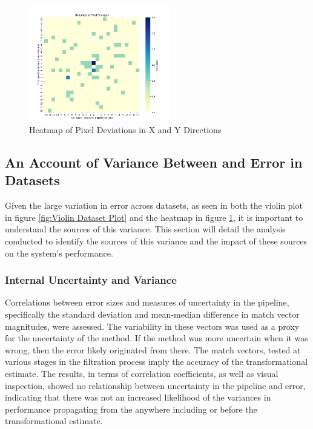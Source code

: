 \begin{figure}[H]
    \centering
    \includegraphics[width=0.55\textwidth]{Chapter 5/RESULTPLOTS/BIASPLOT_XY_HEAT.png}
    \caption{Heatmap of Pixel Deviations in X and Y Directions}
    \label{fig:Heatmap_XY_Dev}
\end{figure}


\subsection{An Account of Variance Between and Error in Datasets}
Given the large variation in error across datasets, as seen in both the violin plot in figure \ref{fig:Violin Dataset Plot} and the heatmap in figure \ref{fig:Heatmap_XY_Dev}, it is important to understand the sources of this variance. This section will detail the analysis conducted to identify the sources of this variance and the impact of these sources on the system's performance.

\subsubsection{Internal Uncertainty and Variance}
Correlations between error sizes and measures of uncertainty in the pipeline, specifically the standard deviation and mean-median difference in match vector magnitudes, were assessed. The variability in these vectors was used as a proxy for the uncertainty of the method. If the method was more uncertain when it was wrong, then the error likely originated from there. The match vectors, tested at various stages in the filtration process imply the accuracy of the transformational estimate. The results, in terms of correlation coefficients, as well as visual inspection, showed no relationship between uncertainty in the pipeline and error, indicating that there was not an increased likelihood of the variances in performance propagating from the anywhere including or before the transformational estimate.  

